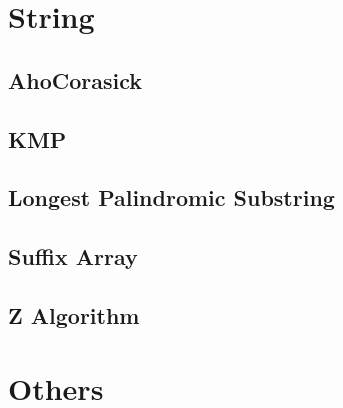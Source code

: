 \documentclass[11pt,twocolumn,a4paper]{article}
\begin{document}

\newpage
\section{String}
\subsection{AhoCorasick}


\subsection{KMP}


\subsection{Longest Palindromic Substring}


\subsection{Suffix Array}


\subsection{Z Algorithm}



\newpage
\section{Others}
\end{document}
